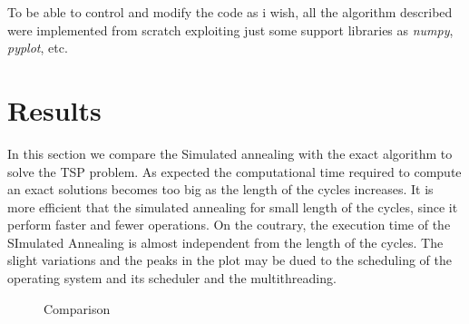 \documentclass{article}
\begin{document}
\noindent To be able to control and modify the code as i wish, all the algorithm described were implemented from scratch exploiting just some support libraries as \textit{numpy}, \textit{pyplot}, etc.

\section{Results}
In this section we compare the Simulated annealing with the exact algorithm to solve the TSP problem. As expected the computational time required to compute an exact solutions becomes too big as the length of the cycles increases. It is more efficient that the simulated annealing for small length of the cycles, since it perform faster and fewer operations. On the coutrary, the execution time of the SImulated Annealing is almost independent from the length of the cycles. The slight variations and the peaks in the plot may be dued to the scheduling of the operating system and its scheduler and the multithreading.
\begin{figure}[H]
\begin{adjustwidth}{-4em}{-4em}

     \hfill
     
     \caption{Comparison}
    \end{adjustwidth}
   \end{figure}
\end{document}
